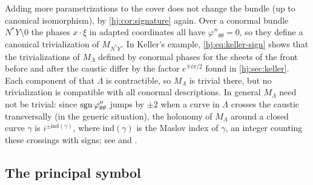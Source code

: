 Adding more parametrizations to the cover does not change the bundle (up to
canonical isomorphism), by \cref{hj:cor:signature} again.  Over a conormal
bundle $N^*Y\setminus0$ the phases $x\cdot\xi$ in adapted coordinates all have
$\varphi''_{\theta\theta}=0$, so they define a canonical trivialization of
$M_{N^*Y}$.  In Keller's example, \eqref{hj:eq:keller-sign} shows that the
trivializations of $M_\Lambda$ defined by conormal phases for the sheets of the
front before and after the caustic differ by the factor $e^{\mp i\pi/2}$ found
in \cref{hj:sec:keller}.  Each component of that $\Lambda$ is contractible, so
$M_\Lambda$ is trivial there, but no trivialization is compatible with all
conormal descriptions.  In general $M_\Lambda$ need not be trivial: since
$\operatorname{sgn}\varphi''_{\theta\theta}$ jumps by $\pm2$ when a curve in $\Lambda$ crosses
the caustic transversally (in the generic situation), the holonomy of $M_\Lambda$
around a closed curve $\gamma$ is $i^{\pm\mathrm{ind}(\gamma)}$, where
$\mathrm{ind}(\gamma)$ is the Maslov index of $\gamma$, an integer counting
these crossings with signs; see \cite[Chapter~21]{Hormander-III} and
\cite[Section~25.1]{Hormander-IV}.

\subsection{The principal symbol}

